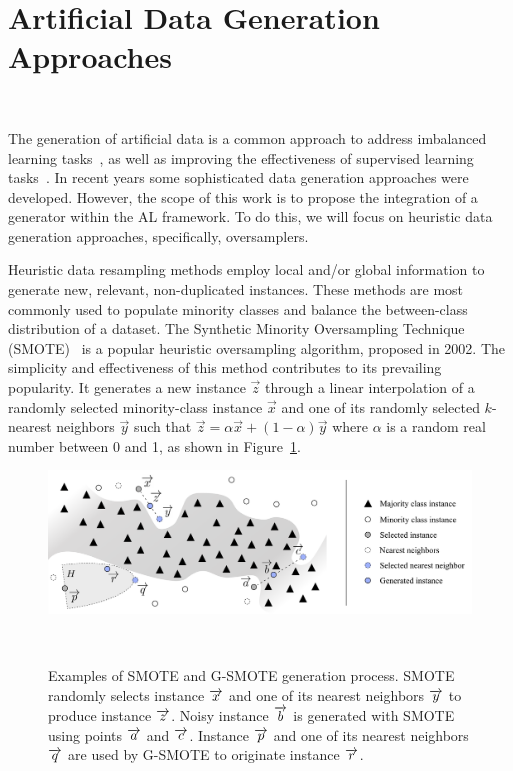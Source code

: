 \documentclass[preprint,12pt]{elsarticle}
\begin{document}
\section{Artificial Data Generation Approaches}~\label{sec:ovs-sota}

The generation of artificial data is a common approach to address imbalanced
learning tasks~\cite{Kaur2019}, as well as improving the effectiveness of
supervised learning tasks~\cite{DeVries2017}. In recent years some
sophisticated data generation approaches were developed. However, the scope of
this work is to propose the integration of a generator within the AL
framework. To do this, we will focus on heuristic data generation approaches,
specifically, oversamplers.

Heuristic data resampling methods employ local and/or global information to
generate new, relevant, non-duplicated instances. These methods are most
commonly used to populate minority classes and balance the between-class
distribution of a dataset. The Synthetic Minority Oversampling Technique
(SMOTE)~\cite{Chawla2002} is a popular heuristic oversampling
algorithm, proposed in 2002. The simplicity and effectiveness of this method
contributes to its prevailing popularity. It generates a new instance
$\overrightarrow{z}$ through a linear interpolation of a randomly selected
minority-class instance $\overrightarrow{x}$ and one of its randomly
selected $k$-nearest neighbors $\overrightarrow{y}$ such that
$\overrightarrow{z} = \alpha\overrightarrow{x} + (1-\alpha)\overrightarrow{y}$
where $\alpha$ is a random real number between 0 and 1, as shown in
Figure~\ref{fig:data_generation}. 

\begin{figure}[H]
	\centering
	\includegraphics[width=\linewidth]{../analysis/data_generation}
    \caption{Examples of SMOTE and G-SMOTE generation process. SMOTE randomly
        selects instance $\protect\overrightarrow{x}$ and one of its nearest
        neighbors $\protect\overrightarrow{y}$ to produce instance 
        $\protect\overrightarrow{z}$. Noisy instance 
        $\protect\overrightarrow{b}$ is generated with SMOTE using points
        $\protect\overrightarrow{a}$ and $\protect\overrightarrow{c}$.
        Instance $\protect\overrightarrow{p}$ and one of its nearest neighbors
        $\protect\overrightarrow{q}$ are used by G-SMOTE to originate instance
        $\protect\overrightarrow{r}$.
    }~\label{fig:data_generation}
\end{figure}
\end{document}
